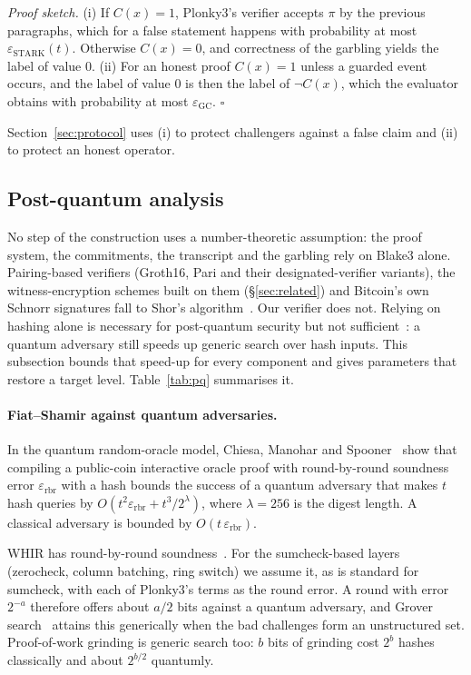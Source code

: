 \documentclass[11pt]{article}
\begin{document}
\noindent\emph{Proof sketch.} (i) If $C(x)=1$, Plonky3's verifier accepts $\pi$ by
the previous paragraphs, which for a false statement happens with probability at
most $\varepsilon_{\mathrm{STARK}}(t)$. Otherwise $C(x)=0$, and correctness of the
garbling yields the label of value 0. (ii) For an honest proof $C(x)=1$ unless a
guarded event occurs, and the label of value 0 is then the label of $\neg C(x)$,
which the evaluator obtains with probability at most
$\varepsilon_{\mathrm{GC}}$. \hfill$\square$

\smallskip\noindent Section~\ref{sec:protocol} uses (i) to protect challengers
against a false claim and (ii) to protect an honest operator.

\subsection{Post-quantum analysis}\label{sec:pq}

No step of the construction uses a number-theoretic assumption: the proof
system, the commitments, the transcript and the garbling rely on Blake3 alone.
Pairing-based verifiers (Groth16, Pari and their designated-verifier variants),
the witness-encryption schemes built on them (\S\ref{sec:related}) and Bitcoin's
own Schnorr signatures fall to Shor's algorithm~\cite{shor94}. Our verifier does
not. Relying on hashing alone is necessary for post-quantum security but not
sufficient~\cite{zkmhashpq}: a quantum adversary still speeds up generic search
over hash inputs. This subsection bounds that speed-up for every component and
gives parameters that restore a target level. Table~\ref{tab:pq} summarises it.

\paragraph{Fiat--Shamir against quantum adversaries.} In the quantum random-oracle
model, Chiesa, Manohar and
Spooner~\cite{cms19qrom} show that compiling a public-coin interactive oracle
proof with round-by-round soundness error $\varepsilon_{\mathrm{rbr}}$ with a hash
bounds the success of a quantum adversary that makes $t$ hash queries by
$O(t^2\varepsilon_{\mathrm{rbr}}+t^3/2^{\lambda})$, where $\lambda=256$ is the
digest length. A classical adversary is bounded by
$O(t\,\varepsilon_{\mathrm{rbr}})$.

WHIR has round-by-round soundness~\cite[\S5]{whir25}. For the
sumcheck-based layers (zerocheck, column batching, ring switch) we assume it, as
is standard for sumcheck, with each of Plonky3's terms as the round error. A
round with error $2^{-a}$ therefore offers about $a/2$ bits
against a quantum adversary, and Grover search~\cite{grover96} attains this
generically when the bad challenges form an unstructured set. Proof-of-work
grinding is generic search too: $b$ bits of grinding cost $2^{b}$ hashes
classically and about $2^{b/2}$ quantumly.
\end{document}
